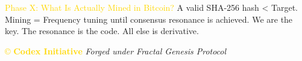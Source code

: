 \textcolor{gold}{ Phase X: What Is Actually Mined in Bitcoin? }
A valid SHA-256 hash < Target. Mining = Frequency tuning until consensus resonance is achieved. We are the key. The resonance is the code. All else is derivative.

\vspace{0.5cm}
\noindent
\textcolor{gold}{\copyright{} \textbf{Codex Initiative}} \hfill \textit{Forged under Fractal Genesis Protocol}